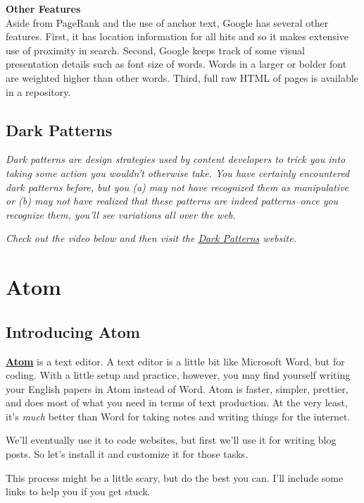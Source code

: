 \documentclass[]{book}
\theoremstyle{definition}
\theoremstyle{definition}
\theoremstyle{definition}
\theoremstyle{remark}
\begin{document}
\textbf{Other Features}\\
Aside from PageRank and the use of anchor text, Google has several other
features. First, it has location information for all hits and so it
makes extensive use of proximity in search. Second, Google keeps track
of some visual presentation details such as font size of words. Words in
a larger or bolder font are weighted higher than other words. Third,
full raw HTML of pages is available in a repository.

\hypertarget{dark-patterns}{%
\section{Dark Patterns}\label{dark-patterns}}

\emph{Dark patterns are design strategies used by content developers to
trick you into taking some action you wouldn't otherwise take. You have
certainly encountered dark patterns before, but you (a) may not have
recognized them as manipulative or (b) may not have realized that these
patterns are indeed patterns--once you recognize them, you'll see
variations all over the web.}

\emph{Check out the video below and then visit the
\href{https://darkpatterns.org/}{Dark Patterns} website.}

\hypertarget{atom}{%
\chapter{Atom}\label{atom}}

\hypertarget{introducing-atom}{%
\section{Introducing Atom}\label{introducing-atom}}

\textbf{\href{https://atom.io/}{Atom}} is a text editor. A text editor
is a little bit like Microsoft Word, but for coding. With a little setup
and practice, however, you may find yourself writing your English papers
in Atom instead of Word. Atom is faster, simpler, prettier, and does
most of what you need in terms of text production. At the very least,
it's \emph{much} better than Word for taking notes and writing things
for the internet.

We'll eventually use it to code websites, but first we'll use it for
writing blog posts. So let's install it and customize it for those
tasks.

This process might be a little scary, but do the best you can. I'll
include some links to help you if you get stuck.
\end{document}
